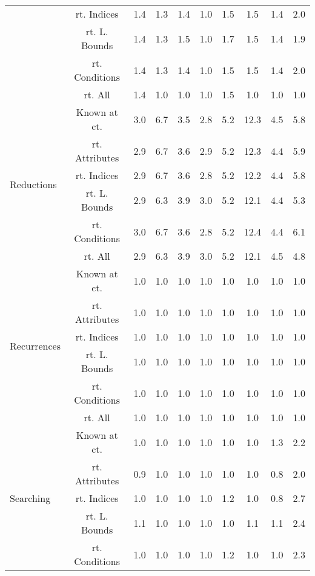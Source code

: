 \documentclass{article}
\begin{document}
\begin{longtable}{|p{2cm}|c|c|c|c|c|c|c|c|c|}
 & rt. Indices & 1.4 & 1.3 & 1.4 & 1.0 & 1.5 & 1.5 & 1.4 & 2.0\\ \cline{2-10}
 & rt. L. Bounds & 1.4 & 1.3 & 1.5 & 1.0 & 1.7 & 1.5 & 1.4 & 1.9\\ \cline{2-10}
 & rt. Conditions & 1.4 & 1.3 & 1.4 & 1.0 & 1.5 & 1.5 & 1.4 & 2.0\\ \cline{2-10}
 & rt. All & 1.4 & 1.0 & 1.0 & 1.0 & 1.5 & 1.0 & 1.0 & 1.0\\ \cline{2-10}
\hline
\multirow{6}{*}{ \parbox{2cm}{Reductions}} & Known at ct. & 3.0 & 6.7 & 3.5 & 2.8 & 5.2 & 12.3 & 4.5 & 5.8\\ \cline{2-10}
 & rt. Attributes & 2.9 & 6.7 & 3.6 & 2.9 & 5.2 & 12.3 & 4.4 & 5.9\\ \cline{2-10}
 & rt. Indices & 2.9 & 6.7 & 3.6 & 2.8 & 5.2 & 12.2 & 4.4 & 5.8\\ \cline{2-10}
 & rt. L. Bounds & 2.9 & 6.3 & 3.9 & 3.0 & 5.2 & 12.1 & 4.4 & 5.3\\ \cline{2-10}
 & rt. Conditions & 3.0 & 6.7 & 3.6 & 2.8 & 5.2 & 12.4 & 4.4 & 6.1\\ \cline{2-10}
 & rt. All & 2.9 & 6.3 & 3.9 & 3.0 & 5.2 & 12.1 & 4.5 & 4.8\\ \cline{2-10}
\hline
\multirow{6}{*}{ \parbox{2cm}{Recurrences}} & Known at ct. & 1.0 & 1.0 & 1.0 & 1.0 & 1.0 & 1.0 & 1.0 & 1.0\\ \cline{2-10}
 & rt. Attributes & 1.0 & 1.0 & 1.0 & 1.0 & 1.0 & 1.0 & 1.0 & 1.0\\ \cline{2-10}
 & rt. Indices & 1.0 & 1.0 & 1.0 & 1.0 & 1.0 & 1.0 & 1.0 & 1.0\\ \cline{2-10}
 & rt. L. Bounds & 1.0 & 1.0 & 1.0 & 1.0 & 1.0 & 1.0 & 1.0 & 1.0\\ \cline{2-10}
 & rt. Conditions & 1.0 & 1.0 & 1.0 & 1.0 & 1.0 & 1.0 & 1.0 & 1.0\\ \cline{2-10}
 & rt. All & 1.0 & 1.0 & 1.0 & 1.0 & 1.0 & 1.0 & 1.0 & 1.0\\ \cline{2-10}
\hline
\multirow{6}{*}{ \parbox{2cm}{Searching}} & Known at ct. & 1.0 & 1.0 & 1.0 & 1.0 & 1.0 & 1.0 & 1.3 & 2.2\\ \cline{2-10}
 & rt. Attributes & 0.9 & 1.0 & 1.0 & 1.0 & 1.0 & 1.0 & 0.8 & 2.0\\ \cline{2-10}
 & rt. Indices & 1.0 & 1.0 & 1.0 & 1.0 & 1.2 & 1.0 & 0.8 & 2.7\\ \cline{2-10}
 & rt. L. Bounds & 1.1 & 1.0 & 1.0 & 1.0 & 1.0 & 1.1 & 1.1 & 2.4\\ \cline{2-10}
 & rt. Conditions & 1.0 & 1.0 & 1.0 & 1.0 & 1.2 & 1.0 & 1.0 & 2.3\\ \cline{2-10}

\end{longtable}
\end{document}
